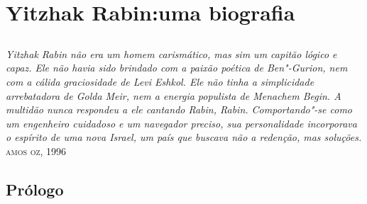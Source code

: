 \part[Yitzhak Rabin: uma biografia]{Yitzhak Rabin:\break uma biografia}

\chapter*{}
\thispagestyle{empty}

\vfill
\begin{flushright}
\textit{Yitzhak Rabin não era um homem carismático, mas sim um capitão lógico e capaz. Ele não havia sido brindado com a paixão poética de Ben"-Gurion, nem com a cálida graciosidade de Levi Eshkol. Ele não tinha a simplicidade arrebatadora de Golda Meir, nem a energia populista de Menachem Begin. A multidão nunca respondeu a ele cantando \textit{Rabin, Rabin}. Comportando"-se como um engenheiro cuidadoso e um navegador preciso, sua personalidade incorporava o espírito de uma nova Israel, um país que buscava não a redenção, mas soluções.}\\ \textsc{amos oz, 1996}
\end{flushright}


\chapter*{Prólogo\smallskip{}}

